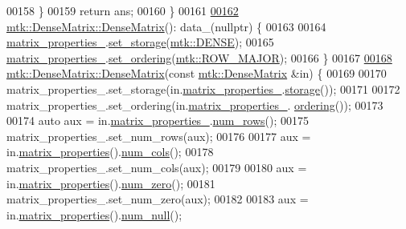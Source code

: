 \begin{DoxyCode}
00158   \}
00159   \textcolor{keywordflow}{return} ans;
00160 \}
00161 
\hypertarget{mtk__dense__matrix_8cc_source_l00162}{}\hyperlink{classmtk_1_1DenseMatrix_a0c75ee704707983f935b02835eab0933}{00162} \hyperlink{classmtk_1_1DenseMatrix_a0c75ee704707983f935b02835eab0933}{mtk::DenseMatrix::DenseMatrix}(): data\_(nullptr) \{
00163 
00164   \hyperlink{classmtk_1_1DenseMatrix_a481c8d09af685a5ba67acefdcaa810cc}{matrix\_properties\_}.\hyperlink{classmtk_1_1Matrix_a111b89f2f21d06a59b8d043123bec625}{set\_storage}(\hyperlink{namespacemtk_ga25b67ec6a2afeee69f9bb196a9c66619a00a806d43a7d74e9ccca47a2134e9c87}{mtk::DENSE});
00165   \hyperlink{classmtk_1_1DenseMatrix_a481c8d09af685a5ba67acefdcaa810cc}{matrix\_properties\_}.\hyperlink{classmtk_1_1Matrix_a8bdaf3f8307b00a36843359f165e1f17}{set\_ordering}(\hyperlink{namespacemtk_ga622801bd9f912d0f976c3e383f5f581cabc55178ac16eb1ce89b5f3ab915a91f3}{mtk::ROW\_MAJOR});
00166 \}
00167 
\hypertarget{mtk__dense__matrix_8cc_source_l00168}{}\hyperlink{classmtk_1_1DenseMatrix_a90102d605a668bf7ecf0d766cc4c10db}{00168} \hyperlink{classmtk_1_1DenseMatrix_a0c75ee704707983f935b02835eab0933}{mtk::DenseMatrix::DenseMatrix}(\textcolor{keyword}{const} 
      \hyperlink{classmtk_1_1DenseMatrix}{mtk::DenseMatrix} &in) \{
00169 
00170   matrix\_properties\_.set\_storage(in.\hyperlink{classmtk_1_1DenseMatrix_a481c8d09af685a5ba67acefdcaa810cc}{matrix\_properties\_}.\hyperlink{classmtk_1_1Matrix_a9ffaa665a9cf7371b3be568415a08a3b}{storage}());
00171 
00172   matrix\_properties\_.set\_ordering(in.\hyperlink{classmtk_1_1DenseMatrix_a481c8d09af685a5ba67acefdcaa810cc}{matrix\_properties\_}.
      \hyperlink{classmtk_1_1Matrix_a13cd17621652cd5551ff98549bd94df7}{ordering}());
00173 
00174   \textcolor{keyword}{auto} aux = in.\hyperlink{classmtk_1_1DenseMatrix_a481c8d09af685a5ba67acefdcaa810cc}{matrix\_properties\_}.\hyperlink{classmtk_1_1Matrix_ab308b25b48e4fcd39fc60e0c3fc66dea}{num\_rows}();
00175   matrix\_properties\_.set\_num\_rows(aux);
00176 
00177   aux = in.\hyperlink{classmtk_1_1DenseMatrix_a5aa83a0643f27a4652ea97630edf7143}{matrix\_properties}().\hyperlink{classmtk_1_1Matrix_a2160118d0edf51cf2aaa806ee1b915f8}{num\_cols}();
00178   matrix\_properties\_.set\_num\_cols(aux);
00179 
00180   aux = in.\hyperlink{classmtk_1_1DenseMatrix_a5aa83a0643f27a4652ea97630edf7143}{matrix\_properties}().\hyperlink{classmtk_1_1Matrix_a17f99bfdf7b8071962c37550028c22b5}{num\_zero}();
00181   matrix\_properties\_.set\_num\_zero(aux);
00182 
00183   aux = in.\hyperlink{classmtk_1_1DenseMatrix_a5aa83a0643f27a4652ea97630edf7143}{matrix\_properties}().\hyperlink{classmtk_1_1Matrix_a79ac4c1b31cef05b41a123917b0ad32f}{num\_null}();

\end{DoxyCode}
